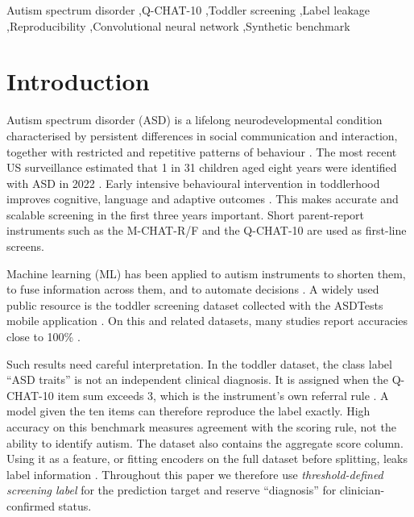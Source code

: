 \documentclass[5p,times,twocolumn]{elsarticle}
\begin{document}
\begin{frontmatter}
\begin{keyword}
Autism spectrum disorder \sep Q-CHAT-10 \sep Toddler screening \sep Label leakage \sep Reproducibility \sep Convolutional neural network \sep Synthetic benchmark
\end{keyword}

\end{frontmatter}

\section{Introduction}
\label{sec:intro}

Autism spectrum disorder (ASD) is a lifelong neurodevelopmental condition characterised by persistent differences in social communication and interaction, together with restricted and repetitive patterns of behaviour \cite{lord2018}. The most recent US surveillance estimated that 1 in 31 children aged eight years were identified with ASD in 2022 \cite{shaw2025}. Early intensive behavioural intervention in toddlerhood improves cognitive, language and adaptive outcomes \cite{dawson2010}. This makes accurate and scalable screening in the first three years important. Short parent-report instruments such as the M-CHAT-R/F \cite{robins2014} and the Q-CHAT-10 \cite{allison2012} are used as first-line screens.

Machine learning (ML) has been applied to autism instruments to shorten them, to fuse information across them, and to automate decisions \cite{wall2012,kosmicki2015,bone2016,duda2016}. A widely used public resource is the toddler screening dataset collected with the ASDTests mobile application \cite{thabtah2017,thabtah2019}. On this and related datasets, many studies report accuracies close to 100\% \cite{akter2019}.

Such results need careful interpretation. In the toddler dataset, the class label ``ASD traits'' is not an independent clinical diagnosis. It is assigned when the Q-CHAT-10 item sum exceeds 3, which is the instrument's own referral rule \cite{allison2012}. A model given the ten items can therefore reproduce the label exactly. High accuracy on this benchmark measures agreement with the scoring rule, not the ability to identify autism. The dataset also contains the aggregate score column. Using it as a feature, or fitting encoders on the full dataset before splitting, leaks label information \cite{kaufman2012}. Throughout this paper we therefore use \emph{threshold-defined screening label} for the prediction target and reserve ``diagnosis'' for clinician-confirmed status.
\end{document}
